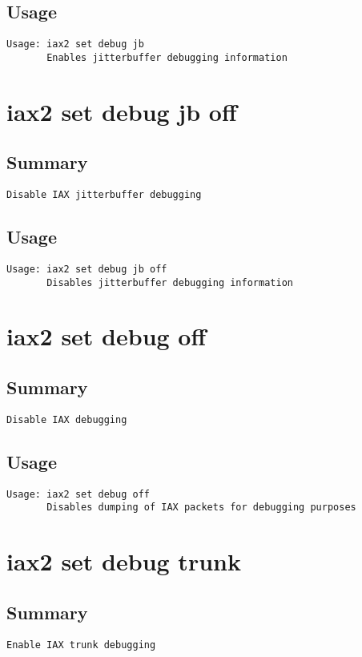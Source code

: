 \subsection{Usage}
\begin{verbatim}
Usage: iax2 set debug jb
       Enables jitterbuffer debugging information

\end{verbatim}


\section{iax2 set debug jb off}
\subsection{Summary}
\begin{verbatim}
Disable IAX jitterbuffer debugging
\end{verbatim}
\subsection{Usage}
\begin{verbatim}
Usage: iax2 set debug jb off
       Disables jitterbuffer debugging information

\end{verbatim}


\section{iax2 set debug off}
\subsection{Summary}
\begin{verbatim}
Disable IAX debugging
\end{verbatim}
\subsection{Usage}
\begin{verbatim}
Usage: iax2 set debug off
       Disables dumping of IAX packets for debugging purposes

\end{verbatim}


\section{iax2 set debug trunk}
\subsection{Summary}
\begin{verbatim}
Enable IAX trunk debugging
\end{verbatim}
